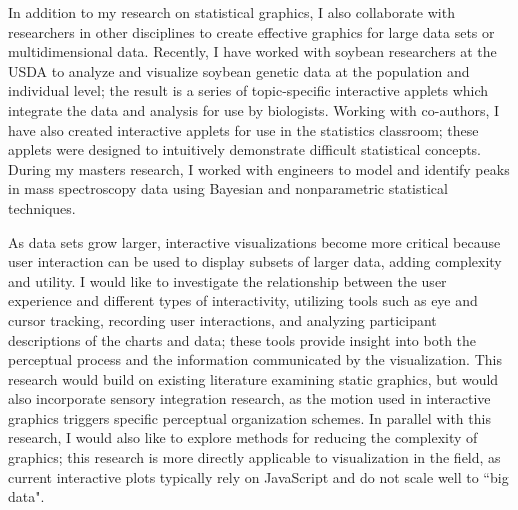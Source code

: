 \documentclass[10.5pt,letterpaper,sans,unicode]{moderncv}        %
\begin{document}
\vspace{.3cm}\hspace{8pt}In addition to my research on statistical graphics, I also collaborate with researchers in other disciplines to create effective graphics for large data sets or multidimensional data. 
Recently, I have worked with soybean researchers at the USDA to analyze and visualize soybean genetic data at the population and individual level; the result is a series of topic-specific interactive applets 
which integrate the data and analysis for use by biologists. 
Working with co-authors, I have also created interactive applets for use in the statistics classroom; these applets were designed to intuitively demonstrate difficult statistical concepts. 
During my masters research, I worked with engineers to model and identify peaks in mass spectroscopy data using Bayesian and nonparametric statistical techniques. 


\vspace{.3cm}\hspace{8pt} As data sets grow larger, interactive visualizations become more critical because user interaction can be used to display subsets of larger data, adding complexity and utility. 
I would like to investigate the relationship between the user experience and different types of interactivity, utilizing tools such as eye and cursor tracking, recording user interactions, and analyzing participant descriptions of the charts and data; these tools provide insight into both the perceptual process and the information communicated by the visualization. 
This research would build on existing literature examining static graphics, but would also incorporate sensory integration research, as the motion used in interactive graphics triggers specific perceptual organization schemes. 
In parallel with this research, I would also like to explore methods for reducing the complexity of graphics; this research is more directly applicable to visualization in the field, as current interactive plots typically rely on JavaScript and do not scale well to ``big data". 
\end{document}
